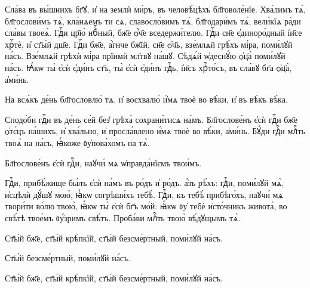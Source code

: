 \label{slavo} 

\hKv Сла́ва въ вы́шнихъ бг҃ꙋ, и҆ на землѝ ми́ръ, въ  человѣ́цѣхъ бл҃говоле́нїе. Хва́лимъ тѧ̀, бл҃гослови́мъ  тѧ̀, кла́нѧемъ ти сѧ, славосло́вимъ тѧ̀, бл҃годари́мъ тѧ̀,  вели́кїѧ ра́ди сла́вы твоеѧ̀. Гдⷭ҇и цр҃ю̀ нбⷭ҇ный, бж҃е  ѻ҆́ч҃е вседержи́телю. Гдⷭ҇и сн҃е є҆диноро́дный і҆и҃се  хрⷭ҇тѐ, и҆ ст҃ы́й дш҃е. Гдⷭ҇и бж҃е, а҆́гнче бж҃їй, сн҃е  ѻ҆ч҃ь, взе́млѧй грѣ́хъ мі́ра, поми́лꙋй на́съ. Взе́млѧй  грѣхѝ мі́ра прїимѝ мл҃твꙋ  на́шꙋ. Сѣдѧ́й ѡ҆деснꙋ́ю ѻ҆ц҃а̀ поми́лꙋй на́съ. Ꙗ҆́кѡ ты̀  є҆сѝ є҆ди́нъ ст҃ъ, ты̀ є҆сѝ є҆ди́нъ гдⷭ҇ь, і҆и҃съ  хрⷭ҇то́съ, въ сла́вꙋ бг҃а ѻ҆ц҃а̀, а҆ми́нь. 

\hKv На всѧ́къ де́нь бл҃гословлю́ тѧ, и҆ восхвалю̀ и҆́мѧ твоѐ во  вѣ́ки, и҆ въ вѣ́къ вѣ́ка. 

\hKv Сподо́би гдⷭ҇и въ де́нь се́й без̾ грѣха̀ сохрани́тисѧ  на́мъ. Бл҃гослове́нъ є҆сѝ гдⷭ҇и бж҃е ѻ҆тє́цъ на́шихъ, и҆  хва́льно, и҆ просла́влено и҆́мѧ твоѐ во вѣ́ки, а҆ми́нь.  Бꙋ́ди гдⷭ҇и млⷭ҇ть твоѧ̀ на на́съ, ꙗ҆́коже ᲂу҆пова́хомъ на  тѧ̀. 

\hKv Бл҃гослове́нъ є҆сѝ гдⷭ҇и, наꙋчи́ мѧ ѡ҆правда́нїємъ  твои́мъ. 

\hKv Гдⷭ҇и, прибѣ́жище бы́лъ є҆сѝ на́мъ въ ро́дъ и҆ ро́дъ.  а҆́зъ рѣ́хъ: гдⷭ҇и, поми́лꙋй мѧ̀, и҆сцѣлѝ дꙋ́шꙋ мою̀,  ꙗ҆́кѡ согрѣши́хъ тебѣ̀. Гдⷭ҇и, къ тебѣ̀ прибѣго́хъ,  наꙋчи́ мѧ твори́ти во́лю твою̀, ꙗ҆́кѡ ты̀ є҆сѝ бг҃ъ мо́й:  ꙗ҆́кѡ ᲂу҆ тебѐ и҆сто́чникъ живота̀, во свѣ́тѣ твое́мъ  ᲂу҆́зримъ свѣ́тъ. Проба́ви млⷭ҇ть твою̀ вѣ́дꙋщымъ тѧ̀.   

\hKv Ст҃ы́й бж҃е, ст҃ы́й крѣ́пкїй, ст҃ы́й безсме́ртный, поми́лꙋй  на́съ. 


\hKv Ст҃ы́й безсме́ртный, поми́лꙋй на́съ. 


\hKv Ст҃ы́й бж҃е, ст҃ы́й крѣ́пкїй,  ст҃ы́й безсме́ртный, поми́лꙋй на́съ.  
